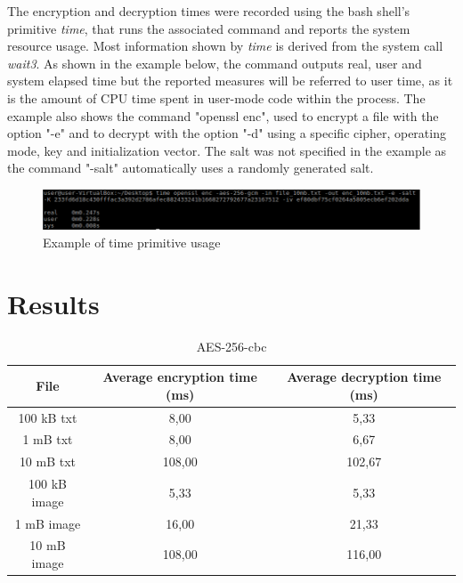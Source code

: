 \documentclass{article}
\begin{document}
The encryption and decryption times were recorded using the bash shell's primitive \textit{time}, that runs the associated command and reports the system resource usage. Most information shown by \textit{time} is derived from the system call \textit{wait3}. As shown in the example below, the command outputs real, user and system elapsed time but the reported measures will be referred to user time, as it is the amount of CPU time spent in user-mode code within the process. The example also shows the command "openssl enc", used to encrypt a file with the option "-e" and to decrypt with the option "-d" using a specific cipher, operating mode, key and initialization vector. The salt was not specified in the example as the command "-salt" automatically uses a randomly generated salt. \\

\begin{figure}[!h]
	\includegraphics[width=1\textwidth]{"img2-hw3-1743261.PNG"}
	\caption{Example of time primitive usage}
\end{figure} 

\section{Results}
 

\begin{table}[!h]
	\centering
	\caption{AES-256-cbc}
	\begin{tabular}[t]{|| c c c ||}
		\hline
		File & Average encryption time (ms) & Average decryption time (ms) \\  [0.5ex]
		\hline\hline
		100 kB txt & 8,00 & 5,33 \\
		\hline
		1 mB txt & 8,00 & 6,67 \\
		\hline
		10 mB txt & 108,00 & 102,67 \\
		\hline
		100 kB image & 5,33 & 5,33 \\
		\hline
		1 mB image & 16,00 & 21,33 \\
		\hline
		10 mB image & 108,00 & 116,00 \\
		\hline
	\end{tabular}
\end{table}
\end{document}
